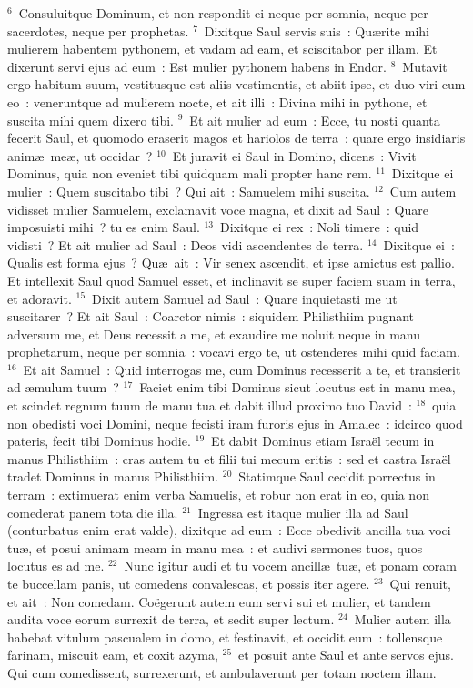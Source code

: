 ${}^{6}$~Consuluitque Dominum, et non respondit ei neque per somnia, neque per sacerdotes, neque per prophetas.
${}^{7}$~Dixitque Saul servis suis~: Qu\ae rite mihi mulierem habentem pythonem, et vadam ad eam, et sciscitabor per illam. Et dixerunt servi ejus ad eum~: Est mulier pythonem habens in Endor.
${}^{8}$~Mutavit ergo habitum suum, vestitusque est aliis vestimentis, et abiit ipse, et duo viri cum eo~: veneruntque ad mulierem nocte, et ait illi~: Divina mihi in pythone, et suscita mihi quem dixero tibi.
${}^{9}$~Et ait mulier ad eum~: Ecce, tu nosti quanta fecerit Saul, et quomodo eraserit magos et hariolos de terra~: quare ergo insidiaris anim\ae\ me\ae , ut occidar~?
${}^{10}$~Et juravit ei Saul in Domino, dicens~: Vivit Dominus, quia non eveniet tibi quidquam mali propter hanc rem.
${}^{11}$~Dixitque ei mulier~: Quem suscitabo tibi~? Qui ait~: Samuelem mihi suscita.
${}^{12}$~Cum autem vidisset mulier Samuelem, exclamavit voce magna, et dixit ad Saul~: Quare imposuisti mihi~? tu es enim Saul.
${}^{13}$~Dixitque ei rex~: Noli timere~: quid vidisti~? Et ait mulier ad Saul~: Deos vidi ascendentes de terra.
${}^{14}$~Dixitque ei~: Qualis est forma ejus~? Qu\ae\ ait~: Vir senex ascendit, et ipse amictus est pallio. Et intellexit Saul quod Samuel esset, et inclinavit se super faciem suam in terra, et adoravit.
${}^{15}$~Dixit autem Samuel ad Saul~: Quare inquietasti me ut suscitarer~? Et ait Saul~: Coarctor nimis~: siquidem Philisthiim pugnant adversum me, et Deus recessit a me, et exaudire me noluit neque in manu prophetarum, neque per somnia~: vocavi ergo te, ut ostenderes mihi quid faciam.
${}^{16}$~Et ait Samuel~: Quid interrogas me, cum Dominus recesserit a te, et transierit ad \ae mulum tuum~?
${}^{17}$~Faciet enim tibi Dominus sicut locutus est in manu mea, et scindet regnum tuum de manu tua et dabit illud proximo tuo David~:
${}^{18}$~quia non obedisti voci Domini, neque fecisti iram furoris ejus in Amalec~: idcirco quod pateris, fecit tibi Dominus hodie.
${}^{19}$~Et dabit Dominus etiam Isra\"el tecum in manus Philisthiim~: cras autem tu et filii tui mecum eritis~: sed et castra Isra\"el tradet Dominus in manus Philisthiim.
${}^{20}$~Statimque Saul cecidit porrectus in terram~: extimuerat enim verba Samuelis, et robur non erat in eo, quia non comederat panem tota die illa.
${}^{21}$~Ingressa est itaque mulier illa ad Saul (conturbatus enim erat valde), dixitque ad eum~: Ecce obedivit ancilla tua voci tu\ae , et posui animam meam in manu mea~: et audivi sermones tuos, quos locutus es ad me.
${}^{22}$~Nunc igitur audi et tu vocem ancill\ae\ tu\ae , et ponam coram te buccellam panis, ut comedens convalescas, et possis iter agere.
${}^{23}$~Qui renuit, et ait~: Non comedam. Co\"egerunt autem eum servi sui et mulier, et tandem audita voce eorum surrexit de terra, et sedit super lectum.
${}^{24}$~Mulier autem illa habebat vitulum pascualem in domo, et festinavit, et occidit eum~: tollensque farinam, miscuit eam, et coxit azyma,
${}^{25}$~et posuit ante Saul et ante servos ejus. Qui cum comedissent, surrexerunt, et ambulaverunt per totam noctem illam.

